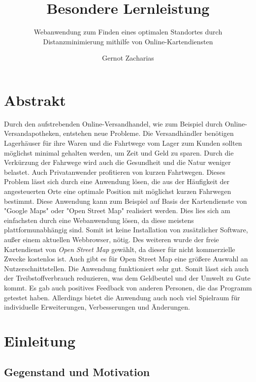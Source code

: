 \documentclass[a4paper, 12pt]{scrreprt}
\title{Besondere Lernleistung}
\author{Gernot Zacharias}
\subtitle{Webanwendung zum Finden eines optimalen Standortes durch Distanzminimierung mithilfe von Online-Kartendiensten}
\begin{document}
\maketitle
\cleardoublepage
\chapter*{Abstrakt}
Durch den aufstrebenden Online-Versandhandel, wie zum Beispiel durch Online-Versandapotheken, entstehen neue Probleme.
Die Versandhändler benötigen Lagerhäuser für ihre Waren und die Fahrtwege vom Lager zum Kunden sollten möglichst minimal gehalten werden, um Zeit und Geld zu sparen.
Durch die Verkürzung der Fahrwege wird auch die Gesundheit und die Natur weniger belastet.
Auch Privatanwender profitieren von kurzen Fahrtwegen.
Dieses Problem lässt sich durch eine Anwendung lösen, die aus der Häufigkeit der angesteuerten Orte eine optimale Position mit möglichst kurzen Fahrwegen bestimmt.
Diese Anwendung kann zum Beispiel auf Basis der Kartendienste von "Google Maps" oder "Open Street Map" realisiert werden.
Dies lies sich am einfachsten durch eine Webanwendung lösen, da diese meistens plattformunabhängig sind.
Somit ist keine Installation von zusätzlicher Software, außer einem aktuellen Webbrowser, nötig.
Des weiteren wurde der freie Kartendienst von \emph{Open Street Map} gewählt, da dieser für nicht kommerzielle Zwecke kostenlos ist.
Auch gibt es für Open Street Map eine größere Auswahl an Nutzerschnittstellen.
Die Anwendung funktioniert sehr gut.%
Somit lässt sich auch der Treibstoffverbrauch reduzieren, was dem Geldbeutel und der Umwelt zu Gute kommt.
Es gab auch positives Feedback von anderen Personen, die das Programm getestet haben.
Allerdings bietet die Anwendung auch noch viel Spielraum für individuelle Erweiterungen, Verbesserungen und Änderungen.
\tableofcontents

\chapter{Einleitung}
\setcounter{page}{1}
\section{Gegenstand und Motivation}
\end{document}
